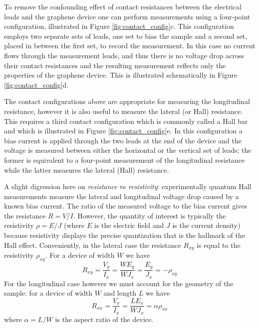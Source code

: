 \documentclass[edeposit,fullpage,draftthesis]{uiucthesis2009}
\begin{document}
            To remove the confounding effect of contact resistances between the electrical leads and the graphene
            device one can perform measurements using a four-point configuration, illustrated in
            Figure \ref{fig:contact_config}c. This configuration employs two separate sets of leads, one set to
            bias the sample and a second set, placed in between the first set, to record the measurement. 
            In this case no current flows through the measurement leads, and thus there is no voltage drop
            across their contact resistances and the resulting measurement reflects only the properties of 
            the graphene device. This is illustrated schematically in Figure \ref{fig:contact_config}d.
            
            The contact configurations above are appropriate for measuring the longitudinal resistance, however it 
            is also useful to measure the lateral (or Hall) resistance. This requires a third contact configuration
            which is commonly called a Hall bar and which is illustrated in Figure \ref{fig:contact_config}e.
            In this configuration a bias current is applied through the two leads at the end of the device
            and the voltage is measured between either the horizontal or the vertical set of leads; the former 
            is equivalent to a four-point measurement of the longitudinal resistance while the latter measures
            the lateral (Hall) resistance.
            
            A slight digression here on \textit{resistance} vs \textit{resistivity}: experimentally quantum Hall measurements 
            measure the lateral and longitudinal voltage drop caused by a known bias current. The ratio of the measured voltage
            to the bias current
            gives the resistance $R = V / I$. However, the quantity of interest is typically the
            resistivity $\rho = E / J$ (where $E$ is the electric field and $J$ is the current density) because
            resistivity displays the precise quantization that is the hallmark of the Hall effect.
            Conveniently, in the lateral case the resistance $R_{xy}$ is equal to the resistivity $\rho_{xy}$.
            For a device of width $W$ we have
            \begin{equation}
                R_{xy} = \frac{V_y}{I_x} = \frac{W E_y}{W J_x} = \frac{E_y}{J_x} = -\rho_{xy}
            \end{equation}
            For the longitudinal case however we must account for the geometry of the sample: for a device of width $W$ and 
            length $L$ we have
            \begin{equation}
                R_{xx} = \frac{V_x}{I_x} = \frac{L E_x}{W J_x} = \alpha \rho_{xx}
            \end{equation}
            where $\alpha = L / W$ is the aspect ratio of the device.
            
\end{document}
